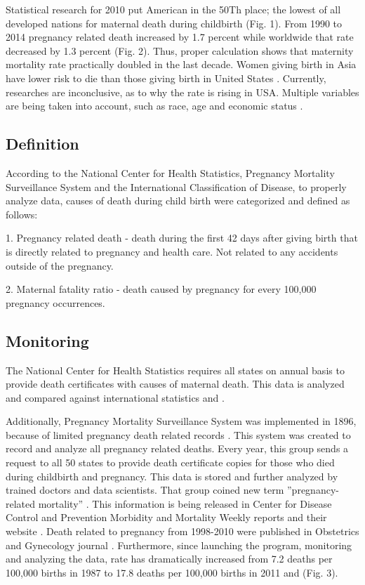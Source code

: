 \documentclass[sigconf]{acmart}
\begin{document}
Statistical research for 2010 put American in the 50Th place; the lowest of all developed nations for maternal death during childbirth (Fig. 1). From 1990 to 2014 pregnancy related death increased by 1.7  percent while worldwide that rate decreased by 1.3 percent (Fig. 2). Thus, proper calculation shows that maternity mortality rate practically doubled in the last decade. Women giving birth in Asia have lower risk to die than those giving birth in United States \cite{world2012trends}. Currently, researches are inconclusive, as to why the rate is rising in USA. Multiple variables are being taken into account, such as race, age and economic status \cite{creanga2012race}.

\subsection{Definition}

According to the National Center for Health Statistics, Pregnancy Mortality Surveillance System and the International Classification of Disease, to properly analyze data, causes of death during child birth were categorized and defined \cite{callaghan2012overview} as follows:

1. Pregnancy related death - death during the first 42 days after giving birth that is directly related to pregnancy and health care. Not  
   related to any accidents outside of the pregnancy.

2. Maternal fatality ratio - death caused by pregnancy for every 100,000 pregnancy occurrences.

\subsection{Monitoring}

The National Center for Health Statistics requires all states on annual basis to provide death certificates with causes of maternal death. This data is analyzed and compared against international statistics \cite{hoyert2007maternal}  and \cite{creanga2014maternal}.

Additionally, Pregnancy Mortality Surveillance System was implemented in 1896, because of limited pregnancy death related records  \cite{horon2011effectiveness}. This system was created to record and analyze all pregnancy related deaths.  Every year, this group sends a request to all 50 states to provide death certificate copies for those who died during childbirth and pregnancy. This data is stored and further analyzed by trained doctors and data scientists. That group coined new term ''pregnancy-related mortality'' \cite{callaghan2012overview}. This information is being released in Center for Disease Control and Prevention Morbidity and Mortality Weekly reports and their website \cite{neggers2016trends}. Death related to pregnancy from 1998-2010 were published in Obstetrics and Gynecology journal \cite{schulz1994assessing}. Furthermore, since launching the program, monitoring and analyzing the data, rate has dramatically increased from 7.2 deaths per 100,000 births in 1987 to 17.8 deaths per 100,000 births in 2011 \cite{neggers2016trends} and (Fig. 3).
\end{document}
